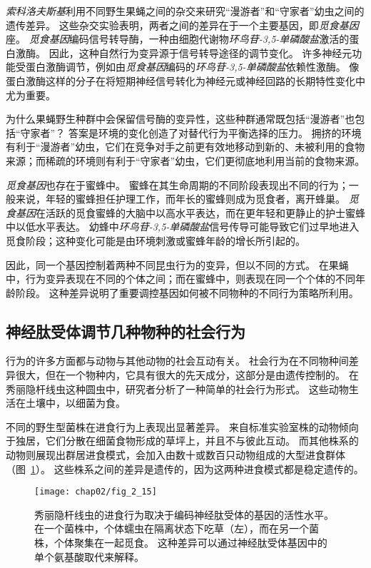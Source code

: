 \textit{索科洛夫斯基}利用不同野生果蝇之间的杂交来研究“漫游者”和“守家者”幼虫之间的遗传差异。
这些杂交实验表明，两者之间的差异在于一个主要基因，即\textit{觅食基因}座。
\textit{觅食基因}编码信号转导酶，一种由细胞代谢物\textit{环鸟苷-3,5-单磷酸盐}激活的蛋白激酶。
因此，这种自然行为变异源于信号转导途径的调节变化。
许多神经元功能受蛋白激酶调节，例如由\textit{觅食基因}编码的\textit{环鸟苷-3,5-单磷酸盐}依赖性激酶。
像蛋白激酶这样的分子在将短期神经信号转化为神经元或神经回路的长期特性变化中尤为重要。


为什么果蝇野生种群中会保留信号酶的变异性，这些种群通常既包括“漫游者”也包括“守家者”？
答案是环境的变化创造了对替代行为平衡选择的压力。 
拥挤的环境有利于“漫游者”幼虫，它们在竞争对手之前更有效地移动到新的、未被利用的食物来源；而稀疏的环境则有利于“守家者”幼虫，它们更彻底地利用当前的食物来源。


\textit{觅食基因}也存在于蜜蜂中。
蜜蜂在其生命周期的不同阶段表现出不同的行为；一般来说，年轻的蜜蜂担任护理工作，而年长的蜜蜂则成为觅食者，离开蜂巢。
\textit{觅食基因}在活跃的觅食蜜蜂的大脑中以高水平表达，而在更年轻和更静止的护士蜜蜂中以低水平表达。
幼蜂中\textit{环鸟苷-3,5-单磷酸盐}信号传导可能导致它们过早地进入觅食阶段；这种变化可能是由环境刺激或蜜蜂年龄的增长所引起的。


因此，同一个基因控制着两种不同昆虫行为的变异，但以不同的方式。
在果蝇中，行为变异表现在不同的个体之间；而在蜜蜂中，则表现在同一个个体的不同年龄阶段。
这种差异说明了重要调控基因如何被不同物种的不同行为策略所利用。



\subsection{神经肽受体调节几种物种的社会行为}

行为的许多方面都与动物与其他动物的社会互动有关。
社会行为在不同物种间差异很大，但在一个物种内，它具有很大的先天成分，这部分是由遗传控制的。
在秀丽隐杆线虫这种圆虫中，研究者分析了一种简单的社会行为形式。
这些动物生活在土壤中，以细菌为食。



不同的野生型菌株在进食行为上表现出显著差异。
来自标准实验室株的动物倾向于独居，它们分散在细菌食物形成的草坪上，并且不与彼此互动。
而其他株系的动物则展现出群居进食模式，会加入由数十或数百只动物组成的大型进食群体（图~\ref{fig:2_15}）。
这些株系之间的差异是遗传的，因为这两种进食模式都是稳定遗传的。






\begin{figure}[htbp]
	\centering
	\texttt{[image: chap02/fig\_2\_15]}
	\caption{秀丽隐杆线虫的进食行为取决于编码神经肽受体的基因的活性水平。
		在一个菌株中，个体蠕虫在隔离状态下吃草（左），而在另一个菌株，个体聚集在一起觅食。
		这种差异可以通过神经肽受体基因中的单个氨基酸取代来解释\cite{de1998natural}。}
	\label{fig:2_15}
\end{figure}


